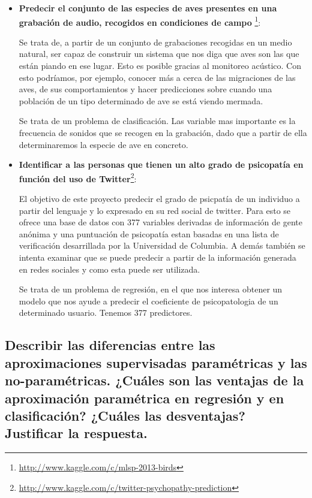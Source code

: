 \begin{itemize}

\item \textbf{Predecir el conjunto de las especies de aves presentes en una grabación de audio, recogidos en condiciones de campo }\footnote{\url{http://www.kaggle.com/c/mlsp-2013-birds}}:

Se trata de, a partir de un conjunto de grabaciones recogidas en un medio natural, ser capaz de construir un sistema que nos diga que aves son las que están piando en ese lugar. Esto es posible gracias al monitoreo acústico. Con esto podríamos, por ejemplo, conocer más a cerca de las migraciones de las aves, de sus comportamientos y hacer predicciones sobre cuando una población de un tipo determinado de ave se está viendo mermada.

Se trata de un problema de clasificación. Las variable mas importante es la frecuencia de sonidos que se recogen en la grabación, dado que a partir de ella determinaremos la especie de ave en concreto.

\item \textbf{Identificar a las personas que tienen un alto grado de psicopatía en función del uso de Twitter}\footnote{\url{http://www.kaggle.com/c/twitter-psychopathy-prediction}}:

El objetivo de este proyecto predecir el grado de psicpatía de un individuo a partir del lenguaje y lo expresado en su red social de twitter. Para esto se ofrece una base de datos con 377 variables derivadas de información de gente anónima y una puntuación de psicopatía estan basadas en una lista de verificación desarrillada por la Universidad de Columbia. A demás también se intenta examinar que se puede predecir a partir de la información generada en redes sociales y como esta puede ser utilizada.

Se trata de un problema de regresión, en el que nos interesa obtener un modelo que nos ayude a predecir el coeficiente de psicopatologia de un determinado usuario. Tenemos 377 predictores.

\end{itemize}
\newpage

\subsection{Describir las diferencias entre las aproximaciones supervisadas paramétricas y las no-paramétricas. ¿Cuáles son las ventajas de la aproximación paramétrica en regresión y en clasificación? ¿Cuáles las desventajas? Justificar la respuesta.}

